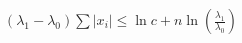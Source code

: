 \documentclass[preview]{standalone}
\begin{document}
\begin{align*}
(\lambda_1-\lambda_0)\sum |x_i| \leq \ln c + n\ln\left(\frac{\lambda_1}{\lambda_0}\right)
\end{align*}
\end{document}
